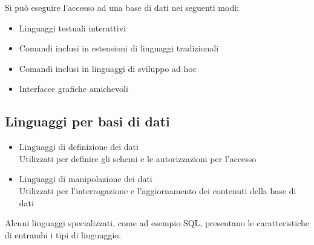 \documentclass[../main.tex]{subfiles}
\begin{document}
	Si può eseguire l'accesso ad una base di dati nei seguenti modi:
	\begin{itemize}
		\item Linguaggi testuali interattivi 
		\item Comandi inclusi in estensioni di linguaggi tradizionali 
		\item Comandi inclusi in linguaggi di sviluppo ad hoc 
		\item Interfacce grafiche amichevoli
	\end{itemize}
	\subsection{Linguaggi per basi di dati}
	\begin{itemize}
		\item Linguaggi di definizione dei dati\\
		Utilizzati per definire gli schemi e le autorizzazioni per l’accesso
		\item Linguaggi di manipolazione dei dati\\
		Utilizzati per l’interrogazione e l’aggiornamento dei contenuti della base di dati
	\end{itemize}
	Alcuni linguaggi specializzati, come ad esempio SQL, presentano le caratteristiche di entrambi i tipi di linguaggio.
\end{document}
